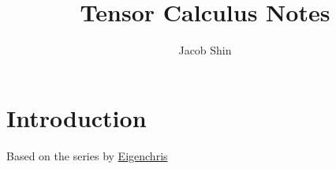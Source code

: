 \documentclass{report}
\title{\Huge{Tensor Calculus Notes}\\}
\author{\huge{Jacob Shin}}
\date{}
\begin{document}
\maketitle
\newpage%
\tableofcontents
\pagebreak

\setcounter{chapter}{-1}
\chapter{Introduction}
Based on the series by \href{https://youtube.com/playlist?list=PLJHszsWbB6hpk5h8lSfBkVrpjsqvUGTCx}{Eigenchris}
\end{document}
